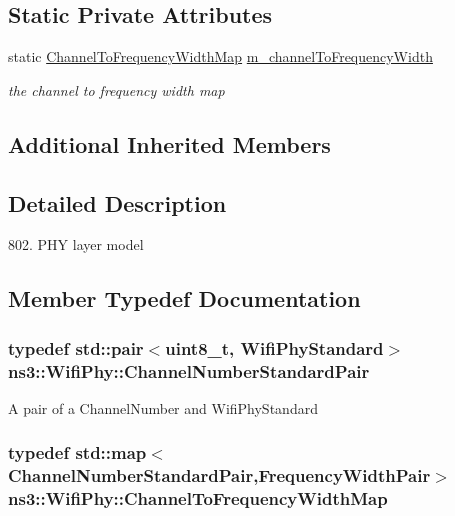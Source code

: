 \subsection*{Static Private Attributes}
\begin{DoxyCompactItemize}
\item 
static \hyperlink{classns3_1_1WifiPhy_a4d1dae8b6a2732b7c08343909a53ea3f}{Channel\+To\+Frequency\+Width\+Map} \hyperlink{classns3_1_1WifiPhy_ad19aaf8e6db288dcfbba6fce31dccbaf}{m\+\_\+channel\+To\+Frequency\+Width}
\begin{DoxyCompactList}\small\item\em the channel to frequency width map \end{DoxyCompactList}\end{DoxyCompactItemize}
\subsection*{Additional Inherited Members}


\subsection{Detailed Description}
802. P\+HY layer model 

\subsection{Member Typedef Documentation}
\subsubsection[{\texorpdfstring{Channel\+Number\+Standard\+Pair}{ChannelNumberStandardPair}}]{\setlength{\rightskip}{0pt plus 5cm}typedef std\+::pair$<$uint8\+\_\+t, {\bf Wifi\+Phy\+Standard}$>$ {\bf ns3\+::\+Wifi\+Phy\+::\+Channel\+Number\+Standard\+Pair}}\hypertarget{classns3_1_1WifiPhy_ad473141d47142c2df4a109bc559d6d50}{}\label{classns3_1_1WifiPhy_ad473141d47142c2df4a109bc559d6d50}
A pair of a Channel\+Number and Wifi\+Phy\+Standard 
\subsubsection[{\texorpdfstring{Channel\+To\+Frequency\+Width\+Map}{ChannelToFrequencyWidthMap}}]{\setlength{\rightskip}{0pt plus 5cm}typedef std\+::map$<${\bf Channel\+Number\+Standard\+Pair},{\bf Frequency\+Width\+Pair}$>$ {\bf ns3\+::\+Wifi\+Phy\+::\+Channel\+To\+Frequency\+Width\+Map}\hspace{0.3cm}{\ttfamily [private]}}\hypertarget{classns3_1_1WifiPhy_a4d1dae8b6a2732b7c08343909a53ea3f}{}\label{classns3_1_1WifiPhy_a4d1dae8b6a2732b7c08343909a53ea3f}


